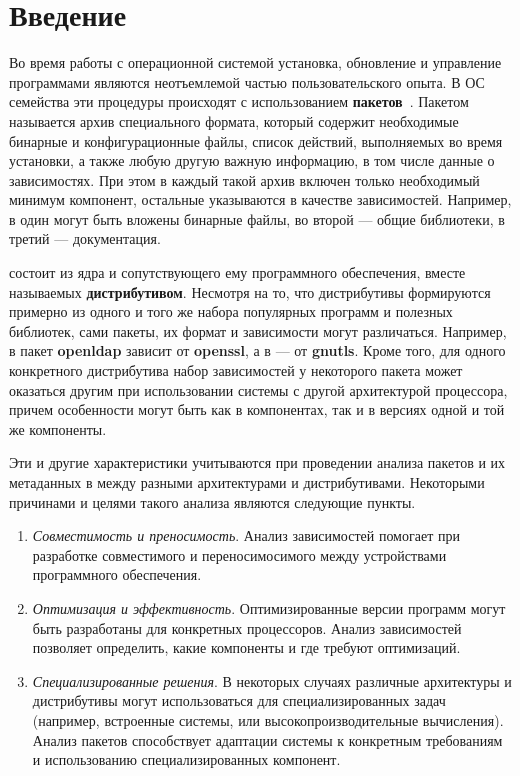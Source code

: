 
\section*{Введение}
\label{sec:intro}

Во время работы с операционной системой установка, обновление и управление программами являются неотъемлемой частью пользовательского опыта.
В ОС семейства {\linux} эти процедуры происходят с использованием \textbf{пакетов}~\cite{IntroductionToLinux}.
Пакетом называется архив специального формата, который содержит необходимые бинарные и конфигурационные файлы, список действий, выполняемых во время установки, а также любую другую важную информацию, в том числе данные о зависимостях.
При этом в каждый такой архив включен только необходимый минимум компонент, остальные указываются в качестве зависимостей.
Например, в один могут быть вложены бинарные файлы, во второй --- общие библиотеки, в третий --- документация.

{\linux} состоит из ядра и сопутствующего ему программного обеспечения, вместе называемых \textbf{дистрибутивом}.
Несмотря на то, что дистрибутивы формируются примерно из одного и того же набора популярных программ и полезных библиотек, сами пакеты, их формат и зависимости могут различаться.
Например, в {\centos} пакет \textbf{openldap} зависит от \textbf{openssl}, а в {\ubuntu} --- от \textbf{gnutls}.
Кроме того, для одного конкретного дистрибутива набор зависимостей у некоторого пакета может оказаться другим при использовании системы с другой архитектурой процессора, причем особенности могут быть как в компонентах, так и в версиях одной и той же компоненты.

Эти и другие характеристики учитываются при проведении анализа пакетов и их метаданных в {\linux} между разными архитектурами и дистрибутивами.
Некоторыми причинами и целями такого анализа являются следующие пункты.
\begin{enumerate}
	\item \textit{Совместимость и преносимость}. Анализ зависимостей помогает при разработке совместимого и переносимосимого между устройствами программного обеспечения.
	\item \textit{Оптимизация и эффективность}. Оптимизированные версии программ могут быть разработаны для конкретных процессоров. Анализ зависимостей позволяет определить, какие компоненты и где требуют оптимизаций.
	\item \textit{Специализированные решения}. В некоторых случаях различные архитектуры и дистрибутивы могут использоваться для специализированных задач (например, встроенные системы, или высокопроизводительные вычисления). Анализ пакетов способствует адаптации системы к конкретным требованиям и использованию специализированных компонент.
\end{enumerate}


